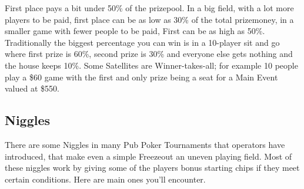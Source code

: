 First place pays a bit under 50\% of the prizepool. In a
big field, with a lot more players to be paid, first place can
be as low as 30\% of the total prizemoney, in a smaller game with
fewer people to be paid, First can be as high as 50\%.
Traditionally the biggest
percentage you can win is in a 10-player sit and go where first prize
is 60\%, second prize is 30\% and everyone else gets nothing and
the house keeps 10\%. Some Satellites are Winner-takes-all; for
example 10 people play a \$60 game with the first and only prize
being a seat for a Main Event valued at \$550.


\subsection{Niggles}

There are some Niggles in many Pub Poker Tournaments that operators
have introduced, that make even a simple Freezeout an
uneven playing field. Most of these niggles work by giving some
of the players bonus starting chips if they meet certain
conditions. Here are main ones you'll encounter.


